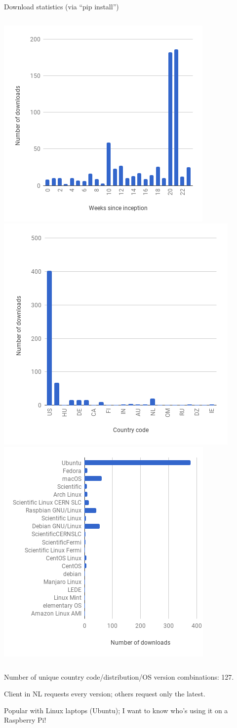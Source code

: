 \documentclass[aspectratio=169]{beamer}
\begin{document}
\begin{frame}{Download statistics (via ``pip install'')}
\vspace{0.3 cm}

\begin{columns}
\includegraphics[width=0.34\linewidth]{downloads-vs-week.png}
\includegraphics[width=0.34\linewidth]{downloads-vs-country.png}
\includegraphics[width=0.33\linewidth]{downloads-vs-os.png}
\end{columns}

\vspace{0.3 cm}
Number of unique country code/distribution/OS version combinations: 127.

\vspace{0.2 cm}
Client in NL requests every version; others request only the latest.

\vspace{0.2 cm}
Popular with Linux laptops (Ubuntu); I want to know who's using it on a Raspberry Pi!
\end{frame}
\end{document}
